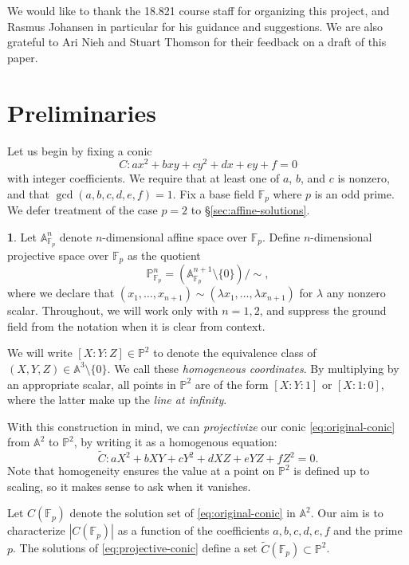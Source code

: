\documentclass[10pt,a4paper]{amsart}
\numberwithin{equation}{section}
\numberwithin{figure}{section}
\numberwithin{table}{section}
\theoremstyle{definition}
\theoremstyle{plain}
\theoremstyle{remark}
\theoremstyle{plain}
\theoremstyle{definition}
\newtheorem{defn}[thm]{\protect\definitionname}
\theoremstyle{plain}
\theoremstyle{plain}
\providecommand{\definitionname}{Definition}
\newcommand{\A}{\mathbb{A}}
\renewcommand{\P}{\mathbb{P}}
\newcommand{\F}{\mathbb{F}}
\begin{document}
	We would like to thank the 18.821 course staff for organizing this project, and Rasmus Johansen in particular for his guidance and suggestions. We are also grateful
	to Ari Nieh and Stuart Thomson for their feedback on a draft of this paper.
	
	
	\section{Preliminaries}\label{sec:projectivization-of-the-problem}
	
	Let us begin by fixing a conic
	\begin{equation}\label{eq:original-conic} 
	C \colon ax^2 + bxy + cy^2 + dx + ey + f = 0 
	\end{equation} 
	with integer coefficients. We require that at least one of 
	$a$, $b$, and $c$ is nonzero, and that $\gcd(a,b,c,d,e,f)=1$.
	Fix a base field $\F_p$ where $p$ is an odd prime. We defer treatment of the case $p = 2$ to \S\ref{sec:affine-solutions}.
	\begin{defn}
		Let $\A^n_{\F_p}$ denote $n$-dimensional affine space over $\F_p$. Define 
		$n$-dimensional projective space over $\F_p$ as the quotient
		\[ \P^n_{\F_p} = (\A^{n+1}_{\F_p}\setminus \{0\})/{\sim}, \]
		where we declare that $(x_1,\ldots,x_{n+1}) \sim 
		(\lambda x_1,\ldots,\lambda x_{n+1})$ for $\lambda$ any nonzero scalar. 
		Throughout, we will work only with $n = 1, 2$, and suppress the ground field
		from the notation when it is clear from context.
		
		We will write $[X:Y:Z]\in \P^2$ to denote the equivalence 
		class of $(X,Y,Z)\in \A^3 \setminus \{0\}$. We call these \emph{homogeneous
		coordinates}. By multiplying by an appropriate scalar, all points in $\P^2$ are
		of the form $[X:Y:1]$ or $[X:1:0]$, where the latter make up the \emph{line at
		infinity}.
	\end{defn}
	
	With this construction in mind, we can \emph{projectivize} our conic
	\eqref{eq:original-conic} from $\A^2$ to $\P^2$, by writing it as a 
	homogenous equation: 
	\begin{equation}\label{eq:projective-conic} 
	\widetilde{C} \colon aX^2 + bXY + cY^2 + dXZ + eYZ + fZ^2 = 0. 
	\end{equation}
	Note that homogeneity ensures the value at a point on $\P^2$ is defined up to scaling,
	so it makes sense to ask when it vanishes.
	
	Let $C(\F_p)$ denote the solution set of \eqref{eq:original-conic} in $\A^2$. Our aim
	is to characterize $|C(\F_p)|$ as a function of the coefficients $a,b,c,d,e,f$ and 
	the prime $p$. The solutions of \eqref{eq:projective-conic} define a set
	$\widetilde{C}(\F_p) \subset \P^2$.
	
\end{document}

